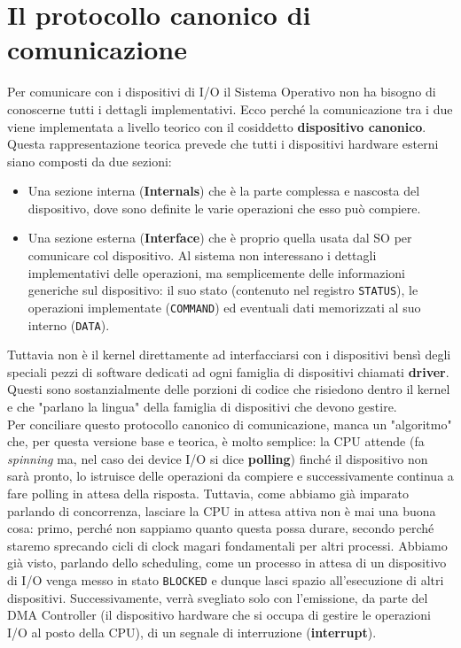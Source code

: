 \documentclass[12pt]{report}
\begin{document}
	\section{Il protocollo canonico di comunicazione}
	Per comunicare con i dispositivi di I/O il Sistema Operativo non ha bisogno di conoscerne tutti i dettagli implementativi. Ecco perché la comunicazione tra i due viene implementata a livello teorico con il cosiddetto \textbf{dispositivo canonico}.\\
	Questa rappresentazione teorica prevede che tutti i dispositivi hardware esterni siano composti da due sezioni:
	\begin{itemize}
		\item Una sezione interna (\textbf{Internals}) che è la parte complessa e nascosta del dispositivo, dove sono definite le varie operazioni che esso può compiere.
		
		\item Una sezione esterna (\textbf{Interface}) che è proprio quella usata dal SO per comunicare col dispositivo. Al sistema non interessano i dettagli implementativi delle operazioni, ma semplicemente delle informazioni generiche sul dispositivo: il suo stato (contenuto nel registro \texttt{STATUS}), le operazioni implementate (\texttt{COMMAND}) ed eventuali dati memorizzati al suo interno (\texttt{DATA}).
	\end{itemize}
	Tuttavia non è il kernel direttamente ad interfacciarsi con i dispositivi bensì degli speciali pezzi di software dedicati ad ogni famiglia di dispositivi chiamati \textbf{driver}. Questi sono sostanzialmente delle porzioni di codice che risiedono dentro il kernel e che "parlano la lingua" della famiglia di dispositivi che devono gestire.\\
	Per conciliare questo protocollo canonico di comunicazione, manca un "algoritmo" che, per questa versione base e teorica, è molto semplice: la CPU attende (fa \textit{spinning} ma, nel caso dei device I/O si dice \textbf{polling}) finché il dispositivo non sarà pronto, lo istruisce delle operazioni da compiere e successivamente continua a fare polling in attesa della risposta. Tuttavia, come abbiamo già imparato parlando di concorrenza, lasciare la CPU in attesa attiva non è mai una buona cosa: primo, perché non sappiamo quanto questa possa durare, secondo perché staremo sprecando cicli di clock magari fondamentali per altri processi. Abbiamo già visto, parlando dello scheduling, come un processo in attesa di un dispositivo di I/O venga messo in stato \texttt{BLOCKED} e dunque lasci spazio all'esecuzione di altri dispositivi. Successivamente, verrà svegliato solo con l'emissione, da parte del DMA Controller (il dispositivo hardware che si occupa di gestire le operazioni I/O al posto della CPU), di un segnale di interruzione (\textbf{interrupt}).
\end{document}
